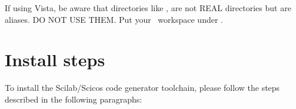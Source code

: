 \begin{warning}
If using Vista, be aware that directories like 
,  are not REAL directories but are aliases. DO NOT USE THEM. Put your \rtd\ workspace under .
\end{warning}


\chapter{Install steps}
\label{ch:install}

To install the Scilab/Scicos code generator toolchain, please follow
the steps described in the following paragraphs:

